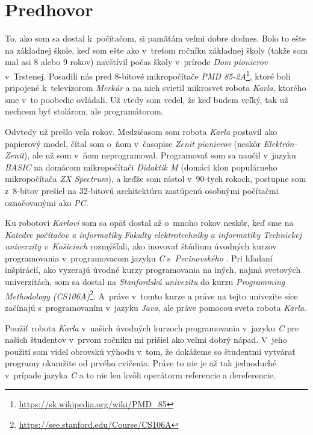 

\chapter*{Predhovor}\label{ch:preface}

To, ako som sa dostal k~počítačom, si pamätám veľmi dobre dodnes. Bolo to ešte na základnej škole, keď som ešte ako  v~treťom ročníku základnej školy (takže som mal asi 8 alebo 9 rokov) navštívil počas školy v~prírode \emph{Dom pionierov} v~Trstenej. Posadili nás pred 8-bitové mikropočítače \emph{PMD 85-2A}\footnote{\url{https://sk.wikipedia.org/wiki/PMD_85}}, ktoré boli pripojené k~televízorom \emph{Merkúr} a na nich svietil mikrosvet robota \emph{Karla}, ktorého sme v~to poobedie ovládali. Už vtedy som vedel, že keď budem veľký, tak už nechcem byť stolárom, ale programátorom.

Odvtedy už prešlo veľa rokov. Medzičasom som robota \emph{Karla} postavil ako papierový model, čítal som o~ňom v~časopise \emph{Zenit pionierov} (neskôr \emph{Elektrón-Zenit}), ale už som v~ňom neprogramoval. Programovať som sa naučil v~jazyku \emph{BASIC} na domácom mikropočítači \emph{Didaktik M} (domáci klon populárneho mikropočítača \emph{ZX Spectrum}), a keďže som rástol v~90-tych rokoch, postupne som z~8-bitov prešiel na 32-bitovú architektúru zastúpenú osobnými počítačmi označovanými ako \emph{PC}.

Ku robotovi \emph{Karlovi} som sa opäť dostal až o~mnoho rokov neskôr, keď sme na \emph{Katedre počítačov a informatiky} \emph{Fakulty elektrotechniky a informatiky} \emph{Technickej univerzity v~Košiciach} rozmýšľali, ako inovovať štúdium úvodných kurzov programovania v~programovacom jazyku \emph{C} s~\emph{Pecinovského}  \cite{pecinovsky}. Pri hľadaní inšpirácií, ako vyzerajú úvodné kurzy programovania na iných, najmä svetových univerzitách, som sa dostal na \emph{Stanfordskú univezitu} do kurzu \emph{Programming Methodology (CS106A)}\footnote{\url{https://see.stanford.edu/Course/CS106A}}. A~práve v~tomto kurze a práve na tejto univezite síce začínajú s~programovaním v~jazyku \emph{Java}, ale práve pomocou sveta robota \emph{Karla}.

Použiť robota \emph{Karla} v~našich úvodných kurzoch programovania v~jazyku \emph{C} pre našich študentov v~prvom ročníku mi prišiel ako veľmi dobrý nápad. V~jeho použití som videl obrovskú výhodu v~tom, že dokážeme so študentmi vytvárať programy okamžite od prvého cvičenia. Práve to nie je až tak jednoduché v~prípade jazyka \emph{C} a to nie len kvôli operátorm referencie a dereferencie.

